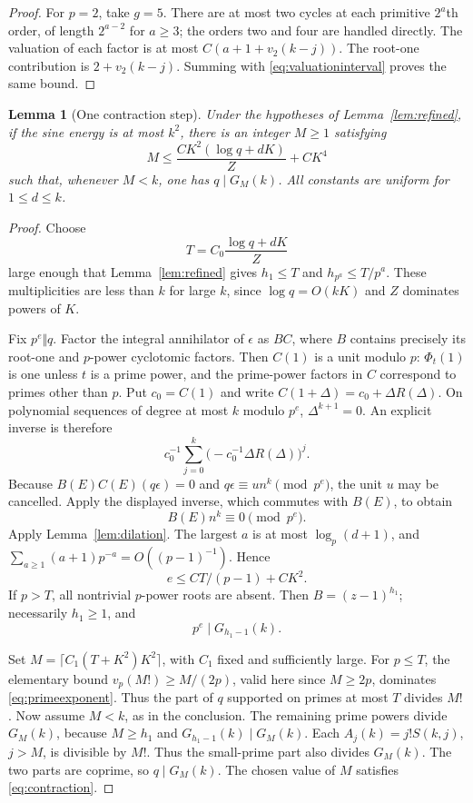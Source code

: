 \documentclass[11pt]{amsart}
\numberwithin{equation}{section}
\newtheorem{lemma}[theorem]{Lemma}
\theoremstyle{remark}
\begin{document}
\begin{proof}
For \(p=2\), take \(g=5\). There are at most two cycles at each
primitive \(2^a\)th order, of length \(2^{a-2}\) for \(a\ge3\);
the orders two and four are handled directly.
The valuation of each factor is at most
\(C(a+1+v_2(k-j))\).
The root-one contribution is \(2+v_2(k-j)\).
Summing with \eqref{eq:valuationinterval} proves the same bound.
\end{proof}

\begin{lemma}[One contraction step]\label{lem:contraction}
Under the hypotheses of Lemma~\ref{lem:refined}, if the sine energy is
at most \(k^2\), there is an integer \(M\ge1\) satisfying
\begin{equation}\label{eq:contraction}
 M\le \frac{CK^2(\log q+dK)}Z+CK^4
\end{equation}
such that, whenever \(M<k\), one has \(q\mid G_M(k)\).
All constants are uniform for \(1\le d\le k\).
\end{lemma}
\begin{proof}
Choose
\[
 T=C_0\frac{\log q+dK}Z
\]
large enough that Lemma~\ref{lem:refined} gives \(h_1\le T\) and
\(h_{p^a}\le T/p^a\). These multiplicities are less than \(k\) for
large \(k\), since \(\log q=O(kK)\) and \(Z\) dominates powers of \(K\).

Fix \(p^e\Vert q\). Factor the integral annihilator of \(\epsilon\)
as \(BC\), where \(B\) contains precisely its root-one and
\(p\)-power cyclotomic factors. Then \(C(1)\) is a unit modulo \(p\):
\(\Phi_t(1)\) is one unless \(t\) is a prime power, and the prime-power
factors in \(C\) correspond to primes other than \(p\).
Put \(c_0=C(1)\) and write \(C(1+\Delta)=c_0+\Delta R(\Delta)\).
On polynomial sequences of degree at most \(k\) modulo \(p^e\),
\(\Delta^{k+1}=0\). An explicit inverse is therefore
\[
 c_0^{-1}\sum_{j=0}^{k}
       \bigl(-c_0^{-1}\Delta R(\Delta)\bigr)^j.
\]
Because \(B(E)C(E)(q\epsilon)=0\) and \(q\epsilon\equiv un^k\pmod {p^e}\),
the unit \(u\) may be cancelled.
Apply the displayed inverse, which commutes with \(B(E)\), to obtain
\[
 B(E)n^k\equiv0\pmod {p^e}.
\]
Apply Lemma~\ref{lem:dilation}. The largest \(a\) is at most
\(\log_p(d+1)\), and
\(\sum_{a\ge1}(a+1)p^{-a}=O((p-1)^{-1})\). Hence
\begin{equation}\label{eq:primeexponent}
 e\le CT/(p-1)+CK^2.
\end{equation}
If \(p>T\), all nontrivial \(p\)-power roots are absent.
Then \(B=(z-1)^{h_1}\); necessarily \(h_1\ge1\), and
\[
 p^e\mid G_{h_1-1}(k).
\]

Set \(M=\lceil C_1(T+K^2)K^2\rceil\), with \(C_1\) fixed and sufficiently
large. For \(p\le T\), the elementary bound
\(v_p(M!)\ge M/(2p)\), valid here since \(M\ge2p\), dominates
\eqref{eq:primeexponent}. Thus the part of \(q\) supported on primes
at most \(T\) divides \(M!\).
Now assume \(M<k\), as in the conclusion.
The remaining prime powers divide \(G_M(k)\), because \(M\ge h_1\)
and \(G_{h_1-1}(k)\mid G_M(k)\).
Each \(A_j(k)=j!S(k,j)\), \(j>M\), is divisible by \(M!\).
Thus the small-prime part also divides \(G_M(k)\).
The two parts are coprime, so \(q\mid G_M(k)\).
The chosen value of \(M\) satisfies \eqref{eq:contraction}.
\end{proof}
\end{document}
